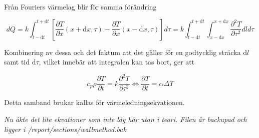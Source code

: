 Från Fouriers värmelag blir för samma förändring

\begin{equation}
dQ = k\int_{t-\mathrm{d}t}^{t+\mathrm{d}t} \left[ \frac{\partial T}{\partial x}\left( x + \mathrm{d}x, \tau \right) - \frac{\partial T}{\partial x}\left( x-\mathrm{d}x, \tau \right)\right]d\tau = k\int_{t-\mathrm{d}t}^{t+\mathrm{d}t} \int_{x-\mathrm{d}x}^{x+\mathrm{d}x} \frac{\partial^2 T}{\partial \tau^2} dld\tau
\end{equation}

Kombinering av dessa och det faktum att det gäller för en godtycklig sträcka $\mathrm{d}l$ samt tid $\mathrm{d}\tau$, vilket innebär att integralen kan tas bort, ger att

\begin{equation}\label{eq:conduction:heateq}\boxed{ \; \; \;
c_p \rho \frac{\partial T}{\partial t} = k \frac{\partial^2 T}{\partial \tau^2} \Leftrightarrow \frac{\partial T}{\partial t} = \alpha \Delta T
\; \; \; }
\end{equation}

Detta samband brukar kallas för värmeledningsekvationen.

\emph{\color{red} Nu åkte det lite ekvationer som inte låg här utan i teori. Filen är backupad och ligger i /report/sections/wallmethod.bak}


